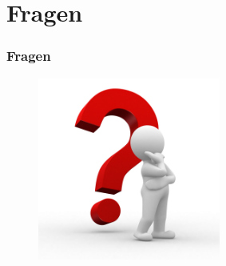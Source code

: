 \documentclass[12pt]{beamer}
\begin{document}
	\section{Fragen}
	\begin{frame}
		\frametitle{Fragen}
		\begin{figure}[H]
		\centering
			\includegraphics[width=6cm]{gfx/questionmark}
		\end{figure}
	\end{frame}
\end{document}

